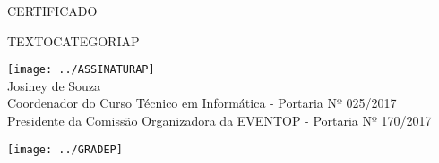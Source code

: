 \documentclass{abnt}
\begin{document}
\BgThispage
\color{CONF_COR}
\bf
\begin{center}
    \Huge{CERTIFICADO}
\end{center}

TEXTOCATEGORIAP


\begin{center}
\texttt{[image: ../ASSINATURAP]}\\
Josiney de Souza\\
Coordenador do Curso Técnico em Informática - Portaria Nº 025/2017\\
Presidente da Comissão Organizadora da EVENTOP - Portaria Nº 170/2017
\end{center}

\newpage
{}

\texttt{[image: ../GRADEP]}
\end{document}
